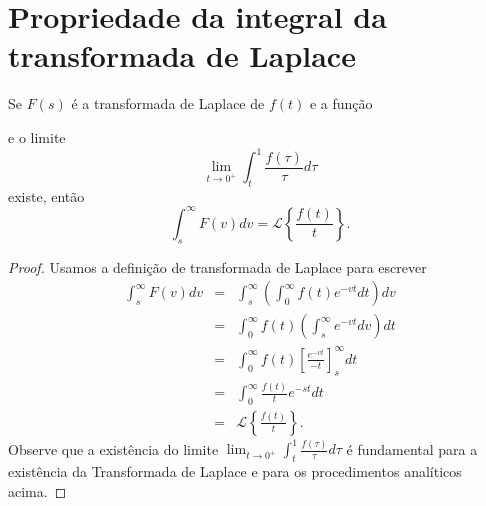 \section{Propriedade da integral da transformada de Laplace}
\begin{propr}{\label{prop_int_transf}}Se $F(s)$ é a transformada de Laplace de $f(t)$ e a função

e o limite
$$
\lim_{t\to 0^+}\int_{t}^1\frac{f(\tau)}{\tau}d\tau
$$
existe, então
\begin{equation}
\int_s^\infty F(v)dv =\mathcal{L}\left\{\frac{f(t)}{t}\right\}.
\end{equation}
 \end{propr}
\begin{proof} Usamos a definição de transformada de Laplace para escrever
\begin{eqnarray*}
\int_s^\infty F(v)dv&=&\int_s^\infty\left(\int_0^\infty f(t)e^{-vt}dt\right)dv\\
&=&\int_0^\infty f(t)\left(\int_s^\infty e^{-vt} dv \right)dt\\
&=&\int_0^\infty f(t)\left[\frac{ e^{-vt}}{-t} \right]_s^\infty dt\\
&=&\int_0^\infty \frac{f(t)}{t} e^{-st}  dt\\
&=&\mathcal{L}\left\{ \frac{f(t)}{t} \right\}.
\end{eqnarray*}
Observe que a existência do limite $\lim_{t\to 0^+}\int_{t}^1\frac{f(\tau)}{\tau}d\tau$ é fundamental para a existência da Transformada de Laplace e para os procedimentos analíticos acima.
\end{proof}
